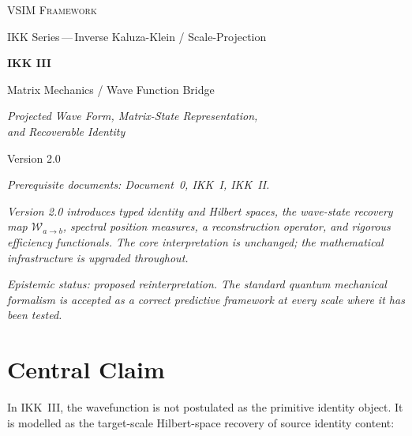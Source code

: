 \documentclass[12pt, a4paper]{article}
\theoremstyle{definition}
\theoremstyle{plain}
\theoremstyle{remark}
\newcommand{\Wab}{\mathcal{W}_{a\to b}}   %
\begin{document}

\begin{titlepage}
  \centering
  \vspace*{2cm}
  {\Large\scshape VSIM Framework\par}
  \vspace{0.4cm}
  {\large IKK Series\,—\,Inverse Kaluza-Klein / Scale-Projection\par}
  \vspace{1.2cm}
  {\Huge\bfseries IKK III\par}
  \vspace{0.5cm}
  {\LARGE Matrix Mechanics / Wave Function Bridge\par}
  \vspace{0.4cm}
  {\large\itshape Projected Wave Form, Matrix-State Representation,\\
  and Recoverable Identity\par}
  \vspace{1.8cm}
  {\large Version 2.0\par}
  \vfill
  {\small
    \textit{Prerequisite documents: Document~0, IKK~I, IKK~II.}\par
    \vspace{0.4cm}
    \textit{Version 2.0 introduces typed identity and Hilbert spaces,
    the wave-state recovery map $\Wab$, spectral position measures,
    a reconstruction operator, and rigorous efficiency functionals.
    The core interpretation is unchanged; the mathematical infrastructure
    is upgraded throughout.}\par
    \vspace{0.4cm}
    \textit{Epistemic status: proposed reinterpretation.
    The standard quantum mechanical formalism is accepted as a
    correct predictive framework at every scale where it has been tested.}
  }
\end{titlepage}

\tableofcontents
\newpage

\section*{Central Claim}

In IKK~III, the wavefunction is not postulated as the primitive identity
object.
It is modelled as the target-scale Hilbert-space recovery of source
identity content:
\end{document}
